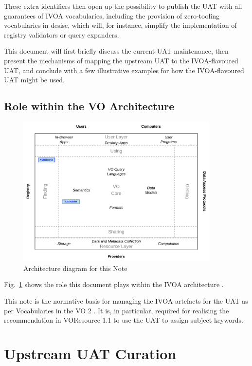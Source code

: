 \documentclass[11pt,a4paper]{ivoa}
\begin{document}
These extra identifiers then open up the possibility to publish the UAT
with all guarantees of IVOA vocabularies, including the provision of
zero-tooling vocabularies in desise, which will, for instance, simplify
the implementation of registry validators or query expanders.

This document will first briefly discuss the current UAT maintenance,
then present the mechanisms of mapping the upstream UAT to the
IVOA-flavoured UAT, and conclude with a few illustrative examples for
how the IVOA-flavoured UAT might be used.

\subsection{Role within the VO Architecture}

\begin{figure}
\centering

\includegraphics[width=0.9\textwidth]{role_diagram.pdf}
\caption{Architecture diagram for this Note}
\label{fig:archdiag}
\end{figure}

Fig.~\ref{fig:archdiag} shows the role this document plays within the
IVOA architecture \citep{note:VOARCH}.

This note is the normative basis for managing the IVOA artefacts for the
UAT as per Vocabularies in the VO 2 \citep{TODO}.  It is, in particular,
required for realising the recommendation in VOResource 1.1
\citep{2018ivoa.spec.0625P} to use the UAT to assign subject keywords.

\section{Upstream UAT Curation}
\end{document}
